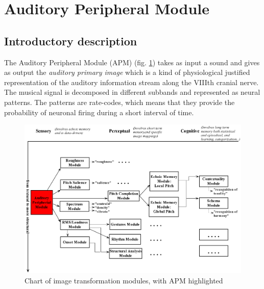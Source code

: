 \newpage
\section{Auditory Peripheral Module}

\hypertarget{Concepts:AuditoryPeripheralModule}{}

\hypertarget{Concepts:IPEMCalcANI}{}
\hypertarget{Concepts:IPEMCalcANIFromFile}{}
\hypertarget{Concepts:IPEMLoadANI}{}
\hypertarget{Concepts:IPEMSaveANI}{}

\subsection{Introductory description}

The Auditory Peripheral Module (APM) (fig. \ref{Fig:ModulesAPM})
takes as input a sound and gives as output the \emph{auditory
primary image} which is a kind of physiological justified
representation of the auditory information stream along the VIIIth
cranial nerve. The musical signal is decomposed in different
subbands and represented as neural patterns. The patterns are
rate-codes, which means that they provide the probability of
neuronal firing during a short interval of time.
\begin{figure}[h]
    \centering
    \includegraphics[width=\textwidth]{Graphics/ModulesAPM}
    \caption{Chart of image transformation modules, with APM highlighted}
    \label{Fig:ModulesAPM}
\end{figure}

